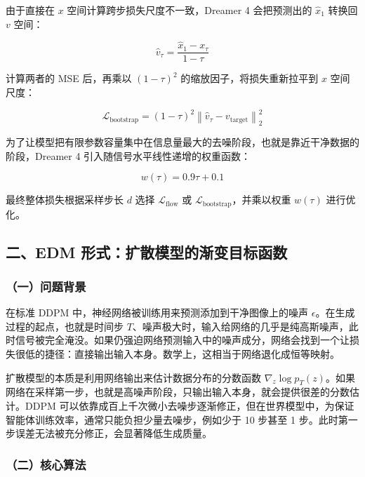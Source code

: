 由于直接在 \(x\) 空间计算跨步损失尺度不一致，Dreamer 4 会把预测出的 \(\hat{x}_1\) 转换回 \(v\) 空间：

\[
\hat{v}_\tau=\frac{\hat{x}_1-x_\tau}{1-\tau}
\]

计算两者的 MSE 后，再乘以 \((1-\tau)^2\) 的缩放因子，将损失重新拉平到 \(x\) 空间尺度：

\[
\mathcal{L}_{\mathrm{bootstrap}}=(1-\tau)^2\left\|\hat{v}_\tau-v_{\mathrm{target}}\right\|_2^2
\]

为了让模型把有限参数容量集中在信息量最大的去噪阶段，也就是靠近干净数据的阶段，Dreamer 4 引入随信号水平线性递增的权重函数：

\[
w(\tau)=0.9\tau+0.1
\]

最终整体损失根据采样步长 \(d\) 选择 \(\mathcal{L}_{\mathrm{flow}}\) 或 \(\mathcal{L}_{\mathrm{bootstrap}}\)，并乘以权重 \(w(\tau)\) 进行优化。

\hypertarget{ux4e8cedm-ux5f62ux5f0fux6269ux6563ux6a21ux578bux7684ux6e10ux53d8ux76eeux6807ux51fdux6570}{%
\subsection{二、EDM 形式：扩散模型的渐变目标函数}\label{ux4e8cedm-ux5f62ux5f0fux6269ux6563ux6a21ux578bux7684ux6e10ux53d8ux76eeux6807ux51fdux6570}}

\hypertarget{ux4e00ux95eeux9898ux80ccux666f-4}{%
\subsubsection{（一）问题背景}\label{ux4e00ux95eeux9898ux80ccux666f-4}}

在标准 DDPM 中，神经网络被训练用来预测添加到干净图像上的噪声 \(\epsilon\)。在生成过程的起点，也就是时间步 \(T\)、噪声极大时，输入给网络的几乎是纯高斯噪声，此时信号被完全淹没。如果仍强迫网络预测输入中的噪声成分，网络会找到一个让损失很低的捷径：直接输出输入本身。数学上，这相当于网络退化成恒等映射。

扩散模型的本质是利用网络输出来估计数据分布的分数函数 \(\nabla_z\log p_T(z)\)。如果网络在采样第一步，也就是高噪声阶段，只输出输入本身，就会提供很差的分数估计。DDPM 可以依靠成百上千次微小去噪步逐渐修正，但在世界模型中，为保证智能体训练效率，通常只能负担少量去噪步，例如少于 10 步甚至 1 步。此时第一步误差无法被充分修正，会显著降低生成质量。

\hypertarget{ux4e8cux6838ux5fc3ux7b97ux6cd5}{%
\subsubsection{（二）核心算法}\label{ux4e8cux6838ux5fc3ux7b97ux6cd5}}

